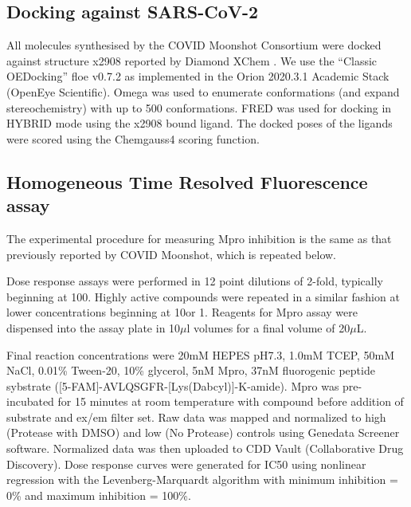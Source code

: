 \subsection{Docking against SARS-CoV-2} \label{subsec:docking}
All molecules synthesised by the COVID Moonshot Consortium were docked against structure x2908 reported by Diamond XChem \cite{Douangamath2020XChem}. We use the “Classic OEDocking” floe v0.7.2 as implemented in the Orion 2020.3.1 Academic Stack (OpenEye Scientific). Omega was used to enumerate conformations (and expand stereochemistry) with up to 500 conformations. FRED was used for docking in HYBRID mode using the x2908 bound ligand. The docked poses of the ligands were scored using the Chemgauss4 scoring function.

\subsection{Homogeneous Time Resolved Fluorescence assay} \label{subsec:assays}
The experimental procedure for measuring Mpro inhibition is the same as that previously reported by COVID Moonshot\cite{Moonshot2022}, which is repeated below.

Dose response assays were performed in 12 point dilutions of 2-fold, typically beginning at 100\uM. Highly active compounds were repeated in a similar fashion at lower concentrations beginning at 10\uM or 1\uM. Reagents for Mpro assay were dispensed into the assay plate in 10$\mu$l volumes for a final volume of 20$\mu$L.

Final reaction concentrations were 20mM HEPES pH7.3, 1.0mM TCEP, 50mM NaCl, 0.01\% Tween-20, 10\% glycerol, 5nM Mpro, 37nM fluorogenic peptide sybstrate ([5-FAM]-AVLQSGFR-[Lys(Dabcyl)]-K-amide). Mpro was pre-incubated for 15 minutes at room temperature with compound before addition of substrate and ex/em filter set. Raw data was mapped and normalized to high (Protease with DMSO) and low (No Protease) controls using Genedata Screener software. Normalized data was then uploaded to CDD Vault (Collaborative Drug Discovery). Dose response curves were generated for IC50 using nonlinear regression with the Levenberg-Marquardt algorithm with minimum inhibition = 0\% and maximum inhibition = 100\%.

